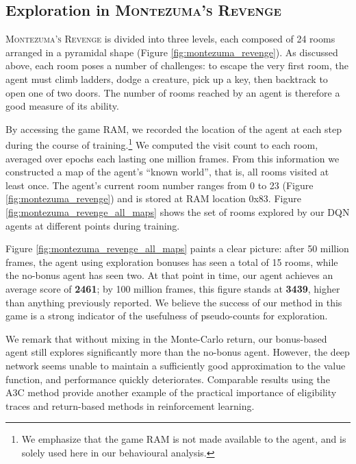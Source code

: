 \documentclass{article}
\newcommand{\gamename}[1]{\textsc{#1}}
\begin{document}
{\subsection{Exploration in \gamename{Montezuma's Revenge}}

\textsc{Montezuma's Revenge} is divided into three levels, each composed of 24 rooms arranged in
a pyramidal shape (Figure \ref{fig:montezuma_revenge}). As discussed above, each room poses
a number of challenges: to escape the very first room, the agent must climb ladders, dodge a 
creature, pick up a key, then backtrack to open one of two doors. The number of rooms reached by
an agent is therefore a good measure of its ability. 
\begin{figure*}
\caption{Layout of levels in \gamename{Montezuma's Revenge}, with rooms numbered from 0 to 23.
The agent begins in room 1 and completes the level upon reaching room 15 (depicted).\label{fig:montezuma_revenge}}
\end{figure*}
By accessing the game RAM, we recorded the location of the agent at each step during the course of
training.\footnote{We emphasize that the game RAM is not made available to the agent, and is solely
used here in our behavioural analysis.} We computed the visit count to each room, averaged over
epochs each lasting one million frames. From this information we constructed a map of the agent's
``known world'', that is, all rooms visited at least once. 
The agent's current room number ranges from 0 to 23 (Figure \ref{fig:montezuma_revenge}) and is
stored at RAM location 0x83. Figure \ref{fig:montezuma_revenge_all_maps} shows the set of rooms
explored by our DQN agents at different points during training. 

Figure \ref{fig:montezuma_revenge_all_maps} paints a clear picture: after 50 million frames, the
agent using exploration bonuses has seen a total of 15 rooms, while the no-bonus agent has seen 
two. At that point in time, our agent achieves an average score of \textbf{2461}; by 100 million
frames, this figure stands at \textbf{3439}, higher than anything previously reported.
We believe the success of our method in this game is a strong indicator of the 
usefulness of pseudo-counts for exploration.

We remark that without mixing in the Monte-Carlo return, our bonus-based agent still explores
significantly more than the no-bonus agent. However, the deep network seems unable to maintain
a sufficiently good approximation to the value function, and performance quickly deteriorates.
Comparable results using the A3C method provide another example of the practical importance of
eligibility traces and return-based methods in reinforcement learning.

}
\end{document}
